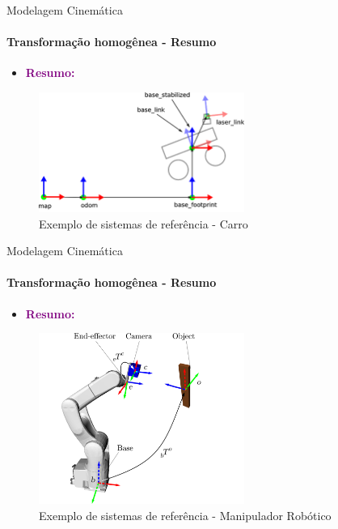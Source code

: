 \documentclass{beamer}
\begin{document}
\begin{frame}[t]{Modelagem Cinemática}
    \framesubtitle{Transformação homogênea - Resumo}
    \begin{itemize}
        \item \textcolor{purple}{\textbf{Resumo:}}
    \end{itemize}
    \begin{figure}
        \centering
        \includegraphics[width=0.6\textwidth]{./images/tf_2.png}
        \caption{Exemplo de sistemas de referência - Carro}
    \end{figure}
\end{frame}


\begin{frame}[t]{Modelagem Cinemática}
    \framesubtitle{Transformação homogênea - Resumo}
    \begin{itemize}
        \item \textcolor{purple}{\textbf{Resumo:}}
    \end{itemize}
    \begin{figure}
        \centering
        \includegraphics[width=0.6\textwidth]{./images/tf_3.png}
        \caption{Exemplo de sistemas de referência - Manipulador Robótico}
    \end{figure}
\end{frame}
\end{document}
